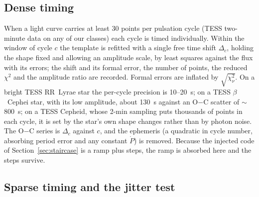 \documentclass[final,5p]{elsarticle}
\newcommand{\oc}{O$-$C}
\newcommand{\bcep}{\ensuremath{\beta}~Cephei}
\begin{document}
\subsection{Dense timing}
\label{sec:dense}

When a light curve carries at least 30 points per pulsation cycle (TESS two-minute data on any of our classes) each cycle is timed individually. Within the window of cycle $c$ the template is refitted with a single free time shift $\Delta_c$, holding the shape fixed and allowing an amplitude scale, by least squares against the flux with its errors; the shift and its formal error, the number of points, the reduced $\chi^2$ and the amplitude ratio are recorded. Formal errors are inflated by $\sqrt{\chi^2_\nu}$. On a bright TESS RR~Lyrae star the per-cycle precision is 10--20~s; on a TESS \bcep{} star, with its low amplitude, about 130~s against an \oc{} scatter of $\sim$800~s; on a TESS Cepheid, whose 2-min sampling puts thousands of points in each cycle, it is set by the star's own shape changes rather than by photon noise. The \oc{} series is $\Delta_c$ against $c$, and the ephemeris (a quadratic in cycle number, absorbing period error and any constant $\dot P$) is removed. Because the injected code of Section~\ref{sec:staircase} is a ramp plus steps, the ramp is absorbed here and the steps survive.

\subsection{Sparse timing and the jitter test}
\label{sec:sparse}
\end{document}
